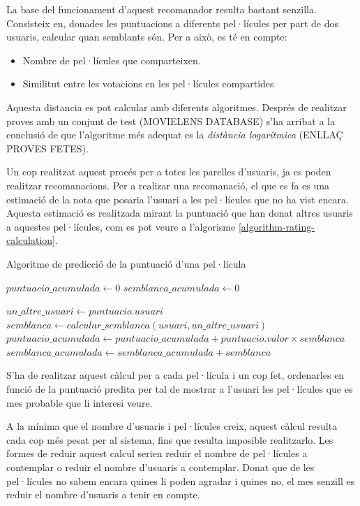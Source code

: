 La base del funcionament d'aquest recomanador resulta bastant senzilla. Consisteix en, donades les puntuacions a diferents pel·lícules per part de dos usuaris, calcular quan semblants són. Per a això, es té en compte:

\begin{itemize}
	\item Nombre de pel·lícules que comparteixen.
	\item Similitut entre les votacions en les pel·lícules compartides
\end{itemize}

Aquesta distancia es pot calcular amb diferents algoritmes. Després de realitzar proves amb un conjunt de test (MOVIELENS DATABASE) s'ha arribat a la conclusió de que l'algoritme més adequat es la \emph{distància logarítmica} (ENLLAÇ PROVES FETES).

Un cop realitzat aquest procés per a totes les parelles d'usuaris, ja es poden realitzar recomanacions. Per a realizar una recomanació, el que es fa es una estimació de la nota que posaria l'usuari a les pel·lícules que no ha vist encara. Aquesta estimació es realitzada mirant la puntuació que han donat altres usuaris a aquestes pel·lícules, com es pot veure a l'algorisme \ref{algorithm-rating-calculation}.

\begin{algorithm}
\caption{Algoritme de predicció de la puntuació d'una pel·lícula}
\label{algorithm-rating-calculation}
\begin{algorithmic}
\State $puntuacio\_acumulada \gets 0$
\State $semblanca\_acumulada \gets 0$

	\State $un\_altre\_usuari \gets puntuacio.usuari$
	\State $semblanca \gets calcular\_semblanca(usuari, un\_altre\_usuari)$
	\State $puntuacio\_acumulada \gets puntuacio\_acumulada + puntuacio.valor \times semblanca$
	\State $semblanca\_acumulada \gets semblanca\_acumulada + semblanca$
\EndFor

\end{algorithmic}
\end{algorithm}

S'ha de realitzar aquest càlcul per a cada pel·lícula i un cop fet, ordenarles en funció de la puntuació predita per tal de mostrar a l'usuari les pel·lícules que es mes probable que li interesi veure.

A la mínima que el nombre d'usuaris i pel·lícules creix, aquest càlcul resulta cada cop més pesat per al sistema, fins que resulta imposible realitzarlo. Les formes de reduir aquest calcul serien reduir el nombre de pel·lícules a contemplar o reduir el nombre d'usuaris a contemplar. Donat que de les pel·lícules no sabem encara quines li poden agradar i quines no, el mes senzill es reduir el nombre d'usuaris a tenir en compte.

